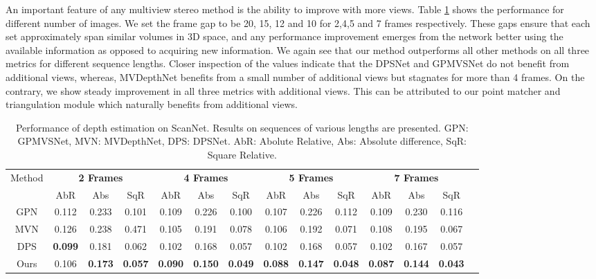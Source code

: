 \documentclass[runningheads]{llncs}
\begin{document}
An important feature of any multiview stereo method is the ability to improve with more views. Table \ref{table3} shows the performance for different number of images. We set the frame gap to be 20, 15, 12 and 10 for 2,4,5 and 7 frames respectively. These gaps ensure that each set approximately span similar volumes in 3D space, and any performance improvement emerges from the network better using the available information as opposed to acquiring new information. We again see that our method outperforms all other methods on all three metrics for different sequence lengths. Closer inspection of the values indicate that the DPSNet and GPMVSNet do not benefit from additional views, whereas, MVDepthNet benefits from a small number of additional views but stagnates for more than 4 frames. On the contrary, we show steady improvement in all three metrics with additional views. This can be attributed to our point matcher and triangulation module which naturally benefits from additional views. 
\begin{table}[t]
  \caption{Performance of depth estimation on ScanNet. Results on sequences of various lengths are presented. GPN: GPMVSNet, MVN: MVDepthNet, DPS: DPSNet. AbR: Abolute Relative, Abs: Absolute difference, SqR: Square Relative.}
  \centering
\begin{tabular}{cccccccccccccc}
 \hline 
   Method    & \multicolumn{3}{c}{\textbf{2 Frames} } & \multicolumn{3}{c}{\textbf{4 Frames}}& \multicolumn{3}{c}{\textbf{5 Frames}}& \multicolumn{3}{c}{\textbf{7 Frames}}\\ \cline{2-13}
     &AbR  &Abs & SqR  &AbR  &Abs & SqR &AbR  &Abs & SqR &AbR  &Abs & SqR\\

    \hline
GPN & 0.112 & 0.233 & 0.101 & 0.109 & 0.226 & 0.100 & 0.107 & 0.226 & 0.112 & 0.109 & 0.230 & 0.116\\

MVN &  0.126 & 0.238 & 0.471 & 0.105 & 0.191 & 0.078 & 0.106 & 0.192 & 0.071 & 0.108 & 0.195 & 0.067 \\

DPS & \textbf{0.099} & 0.181 & 0.062 & 0.102 & 0.168 & 0.057 & 0.102 & 0.168 & 0.057 & 0.102 & 0.167 & 0.057		 \\

Ours & 	0.106 & \textbf{0.173} & \textbf{0.057} & \textbf{0.090} & \textbf{0.150} & \textbf{0.049} & \textbf{0.088} & \textbf{0.147} & \textbf{0.048} & \textbf{0.087} & \textbf{0.144} & \textbf{0.043} \\
\hline
  \end{tabular}
  \label{table3}
\end{table}
\end{document}
